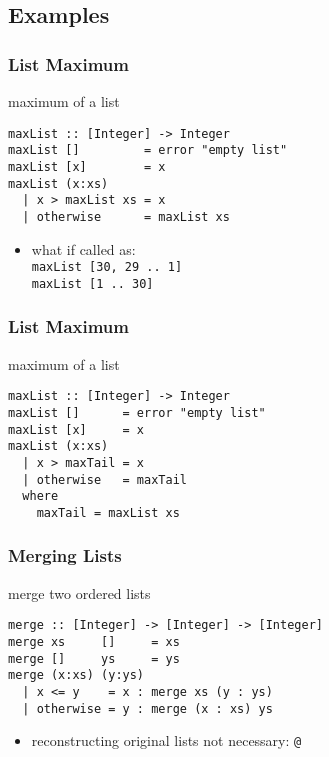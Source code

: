 \documentclass[dvipsnames]{beamer}
\theoremstyle{plain}
\begin{document}
\subsection{Examples}

\begin{frame}[fragile]
  \frametitle{List Maximum}

  \begin{exampleblock}{maximum of a list}
    \begin{lstlisting}
maxList :: [Integer] -> Integer
maxList []         = error "empty list"
maxList [x]        = x
maxList (x:xs)
  | x > maxList xs = x
  | otherwise      = maxList xs
    \end{lstlisting}
  \end{exampleblock}

  \pause
  \begin{itemize}
    \item what if called as:\\
      \lstinline|maxList [30, 29 .. 1]|\\
      \lstinline|maxList [1 .. 30]|
  \end{itemize}
\end{frame}

\begin{frame}[fragile]
  \frametitle{List Maximum}

  \begin{exampleblock}{maximum of a list}
    \begin{lstlisting}
maxList :: [Integer] -> Integer
maxList []      = error "empty list"
maxList [x]     = x
maxList (x:xs)
  | x > maxTail = x
  | otherwise   = maxTail
  where
    maxTail = maxList xs
    \end{lstlisting}
  \end{exampleblock}
\end{frame}

\begin{frame}[fragile]
  \frametitle{Merging Lists}

  \begin{exampleblock}{merge two ordered lists}
    \begin{lstlisting}
merge :: [Integer] -> [Integer] -> [Integer]
merge xs     []     = xs
merge []     ys     = ys
merge (x:xs) (y:ys)
  | x <= y    = x : merge xs (y : ys)
  | otherwise = y : merge (x : xs) ys
    \end{lstlisting}
  \end{exampleblock}

  \begin{itemize}
    \item reconstructing original lists not necessary: \lstinline|@|
  \end{itemize}
\end{frame}
\end{document}
